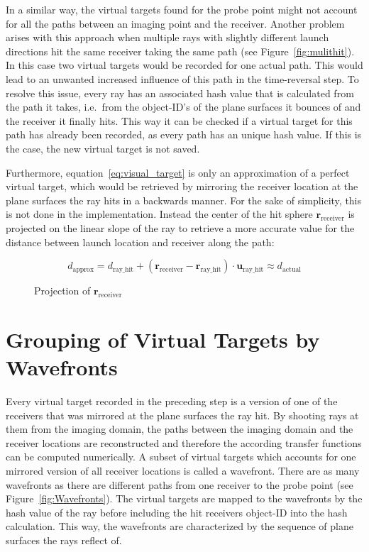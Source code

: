 In a similar way, the virtual targets found for the probe point might not account for all the paths between an imaging point and the receiver.
Another problem arises with this approach when multiple rays with slightly different launch directions hit the same receiver taking the same path (see Figure~\ref{fig:mulithit}).
In this case two virtual targets would be recorded for one actual path.
This would lead to an unwanted increased influence of this path in the time-reversal step.
To resolve this issue, every ray has an associated hash value that is calculated from the path it takes, i.e.~from the object-ID's of the plane surfaces it bounces of and the receiver it finally hits.
This way it can be checked if a virtual target for this path has already been recorded, as every path has an unique hash value.
If this is the case, the new virtual target is not saved.

Furthermore, equation~\eqref{eq:visual_target} is only an approximation of a perfect virtual target, which would be retrieved by mirroring the receiver location at the plane surfaces the ray hits in a backwards manner.
For the sake of simplicity, this is not done in the implementation.
Instead the center of the hit sphere \(\bm{r}_{\text{receiver}}\) is projected on the linear slope of the ray to retrieve a more accurate value for the distance between launch location and receiver along the path:

\begin{equation}
    d_{\text{approx}} = d_{\text{ray\_hit}} +  (\bm{r}_{\text{receiver}} - \bm{r}_{\text{ray\_hit}}) \cdot \bm{u}_{\text{ray\_hit}} \approx d_{\text{actual}}
\end{equation}

\begin{figure}[H]
    \centering
    \def\svgwidth{0.5\textwidth}
    
    \caption{Projection of \(\bm{r}_{\text{receiver}}\)}\label{fig:d_approx}
\end{figure}
 

\section{Grouping of Virtual Targets by Wavefronts}\label{section:subdivision_into_wavefronts}
Every virtual target recorded in the preceding step is a version of one of the receivers that was mirrored at the plane surfaces the ray hit.
By shooting rays at them from the imaging domain, the paths between the imaging domain and the receiver locations are reconstructed and therefore the according transfer functions can be computed numerically.
A subset of virtual targets which accounts for one mirrored version of all receiver locations is called a wavefront.
There are as many wavefronts as there are different paths from one receiver to the probe point (see Figure~\ref{fig:Wavefronts}).
The virtual targets are mapped to the wavefronts by the hash value of the ray before including the hit receivers object-ID into the hash calculation.
This way, the wavefronts are characterized by the sequence of plane surfaces the rays reflect of.

